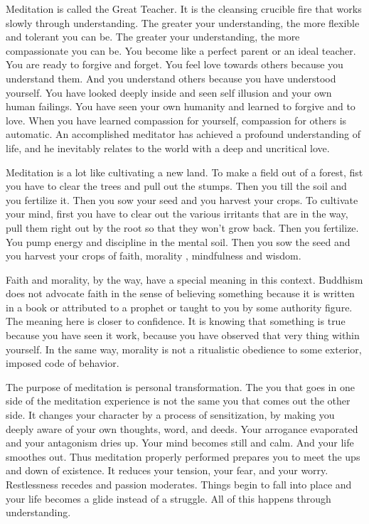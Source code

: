 Meditation is called the Great Teacher. It is the cleansing crucible fire that
works slowly through understanding. The greater your understanding, the more
flexible and tolerant you can be. The greater your understanding, the more
compassionate you can be.  You become like a perfect parent or an ideal teacher.
You are ready to forgive and forget. You feel love towards others because you
understand them. And you understand others because you have understood yourself.
You have looked deeply inside and seen self illusion and your own human
failings. You have seen your own humanity and learned to forgive and to love.
When you have learned compassion for yourself, compassion for others is
automatic. An accomplished meditator has achieved a profound understanding of
life, and he inevitably relates to the world with a deep and uncritical love.

Meditation is a lot like cultivating a new land. To make a field out of a forest, fist you have to clear the trees and pull out the
stumps. Then you till the soil and you fertilize it. Then you sow your seed and
you harvest your crops. To cultivate your mind, first you have to clear out the
various irritants that are in the way, pull them right out by the root so that
they won't grow back.  Then you fertilize. You pump energy and discipline in the
mental soil. Then you sow the seed and you harvest your crops of faith, morality
, mindfulness and wisdom.

Faith and morality, by the way, have a special meaning in this context. Buddhism does not advocate faith in the sense of
believing something because it is written in a book or attributed to a prophet
or taught to you by some authority figure. The meaning here is closer to
confidence. It is knowing that something is true because you have seen it work,
because you have observed that very thing within yourself. In the same way,
morality is not a ritualistic obedience to some exterior, imposed code of
behavior.

The purpose of meditation is personal transformation. The you that goes in one
side of the meditation experience is not the same you that comes out the other
side. It changes your character by a process of sensitization, by making you
deeply aware of your own thoughts, word, and deeds. Your arrogance evaporated
and your antagonism dries up. Your mind becomes still and calm. And your life
smoothes out. Thus meditation properly performed prepares you to meet the ups
and down of existence. It reduces your tension, your fear, and your worry.
Restlessness recedes and passion moderates. Things begin to fall into place and
your life becomes a glide instead of a struggle. All of this happens through
understanding.

